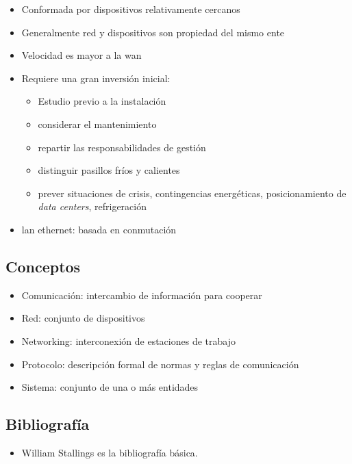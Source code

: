 \begin{itemize}
    \item Conformada por dispositivos relativamente cercanos 
    \item Generalmente red y dispositivos son propiedad del mismo ente 
    \item Velocidad es mayor a la wan 
    \item Requiere una gran inversión inicial:
    \begin{itemize}
        \item Estudio previo a la instalación 
        \item considerar el mantenimiento 
        \item repartir las responsabilidades de gestión 
        \item distinguir pasillos fríos y calientes 
        \item prever situaciones de crisis, contingencias energéticas,
        posicionamiento de \textit{data centers}, refrigeración 
    \end{itemize}
    \item lan ethernet: basada en conmutación 
\end{itemize}

\subsection{Conceptos}
\begin{itemize}
    \item Comunicación: intercambio de información para cooperar
    \item Red: conjunto de dispositivos 
    \item Networking: interconexión de estaciones de trabajo
    \item Protocolo: descripción formal de normas y reglas de comunicación 
    \item Sistema: conjunto de una o más entidades
\end{itemize}


\subsection{Bibliografía}
\begin{itemize}
    \item William Stallings es la bibliografía básica.
\end{itemize}